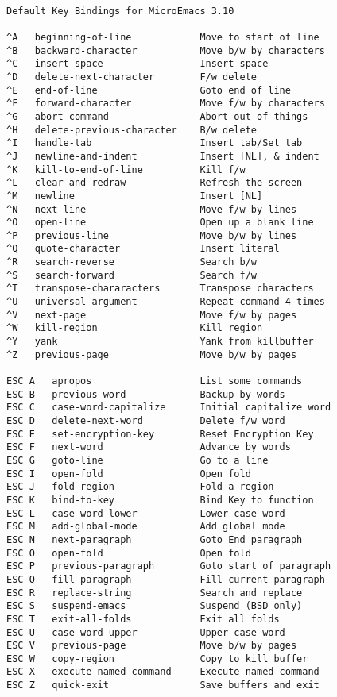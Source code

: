 \begin{verbatim}

Default Key Bindings for MicroEmacs 3.10

^A   beginning-of-line            Move to start of line
^B   backward-character           Move b/w by characters
^C   insert-space                 Insert space
^D   delete-next-character        F/w delete
^E   end-of-line                  Goto end of line
^F   forward-character            Move f/w by characters
^G   abort-command                Abort out of things
^H   delete-previous-character    B/w delete
^I   handle-tab                   Insert tab/Set tab
^J   newline-and-indent           Insert [NL], & indent
^K   kill-to-end-of-line          Kill f/w
^L   clear-and-redraw             Refresh the screen
^M   newline                      Insert [NL]
^N   next-line                    Move f/w by lines
^O   open-line                    Open up a blank line
^P   previous-line                Move b/w by lines
^Q   quote-character              Insert literal
^R   search-reverse               Search b/w
^S   search-forward               Search f/w
^T   transpose-chararacters       Transpose characters
^U   universal-argument           Repeat command 4 times
^V   next-page                    Move f/w by pages
^W   kill-region                  Kill region
^Y   yank                         Yank from killbuffer
^Z   previous-page                Move b/w by pages

ESC A   apropos                   List some commands
ESC B   previous-word             Backup by words
ESC C   case-word-capitalize      Initial capitalize word
ESC D   delete-next-word          Delete f/w word
ESC E   set-encryption-key        Reset Encryption Key
ESC F   next-word                 Advance by words
ESC G   goto-line                 Go to a line
ESC I   open-fold                 Open fold
ESC J   fold-region               Fold a region
ESC K   bind-to-key               Bind Key to function
ESC L   case-word-lower           Lower case word
ESC M   add-global-mode           Add global mode
ESC N   next-paragraph            Goto End paragraph
ESC O   open-fold                 Open fold
ESC P   previous-paragraph        Goto start of paragraph
ESC Q   fill-paragraph            Fill current paragraph
ESC R   replace-string            Search and replace
ESC S   suspend-emacs             Suspend (BSD only)
ESC T   exit-all-folds            Exit all folds
ESC U   case-word-upper           Upper case word
ESC V   previous-page             Move b/w by pages
ESC W   copy-region               Copy to kill buffer
ESC X   execute-named-command     Execute named command
ESC Z   quick-exit                Save buffers and exit


\end{verbatim}
